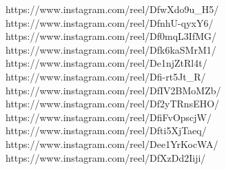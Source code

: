 https://www.instagram.com/reel/DfwXdo9u_H5/ 
https://www.instagram.com/reel/DfnhU-qyxY6/ 
https://www.instagram.com/reel/Df0mqL3IfMG/ 
https://www.instagram.com/reel/Dfk6kaSMrM1/ 
https://www.instagram.com/reel/De1njZtRl4t/ 
https://www.instagram.com/reel/Dfi-rt5Jt_R/ 
https://www.instagram.com/reel/DfIV2BMoMZb/ 
https://www.instagram.com/reel/Df2yTRnsEHO/ 
https://www.instagram.com/reel/DfiFvOpscjW/ 
https://www.instagram.com/reel/Dfti5XjTaeq/ 
https://www.instagram.com/reel/Dee1YrKocWA/ 
https://www.instagram.com/reel/DfXzDd2Iiji/ 
